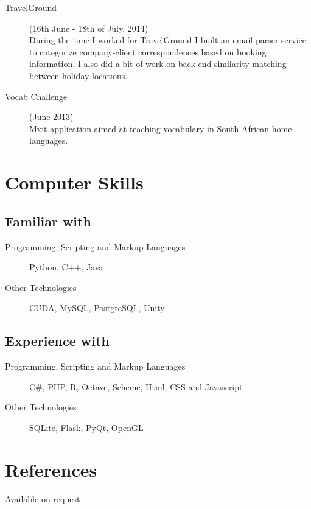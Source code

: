 \documentclass[margin,line,a4paper]{resume}
\begin{document}
\begin{resume}
\begin{description}
                \item[TravelGround] (16th June - 18th of July, 2014) \\
                    During the time I worked for TravelGround I built an email parser service to categorize company-client correspondences based on booking information. I also did a bit of work on back-end similarity matching between holiday locations.

                \item[Vocab Challenge] (June 2013) \\
                    Mxit application aimed at teaching vocabulary in South African home languages.

            \end{description}

        \section{\mysidestyle Computer Skills}
        \subsection{\mysidestyle Familiar with}
            \begin{description}
                \item [Programming, Scripting and Markup Languages] Python, C++, Java
                \item [Other Technologies] CUDA, MySQL, PostgreSQL, Unity
            \end{description}

        \subsection{\mysidestyle Experience with}
            \begin{description}
                \item [Programming, Scripting and Markup Languages] C\#, PHP, R, Octave, Scheme, Html, CSS and Javascript
                \item [Other Technologies] SQLite, Flask, PyQt, OpenGL
            \end{description}

        \section{\mysidestyle References}
            Available on request
    \end{resume}
\end{document}
